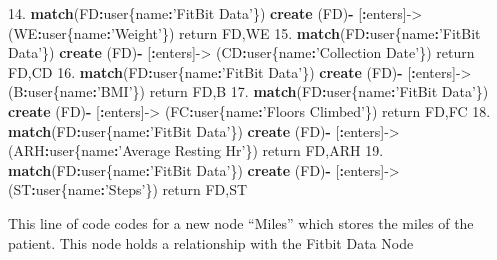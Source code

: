 \documentclass[]{book}
\newenvironment{Shaded}{\begin{snugshade}}{\end{snugshade}}
\newcommand{\KeywordTok}[1]{\textcolor[rgb]{0.13,0.29,0.53}{\textbf{#1}}}
\newcommand{\FloatTok}[1]{\textcolor[rgb]{0.00,0.00,0.81}{#1}}
\newcommand{\StringTok}[1]{\textcolor[rgb]{0.31,0.60,0.02}{#1}}
\newcommand{\OperatorTok}[1]{\textcolor[rgb]{0.81,0.36,0.00}{\textbf{#1}}}
\newcommand{\NormalTok}[1]{#1}
\begin{document}
\begin{Shaded}
\begin{Highlighting}[]
\FloatTok{14.} \KeywordTok{match}\NormalTok{(FD}\OperatorTok{:}\NormalTok{user\{name}\OperatorTok{:}\StringTok{'FitBit Data'}\NormalTok{\}) }\KeywordTok{create}\NormalTok{ (FD)}\OperatorTok{-}\StringTok{ }\NormalTok{[}\OperatorTok{:}\NormalTok{enters]->}\StringTok{ }\NormalTok{(WE}\OperatorTok{:}\NormalTok{user\{name}\OperatorTok{:}\StringTok{'Weight'}\NormalTok{\}) return FD,WE}
\FloatTok{15.} \KeywordTok{match}\NormalTok{(FD}\OperatorTok{:}\NormalTok{user\{name}\OperatorTok{:}\StringTok{'FitBit Data'}\NormalTok{\}) }\KeywordTok{create}\NormalTok{ (FD)}\OperatorTok{-}\StringTok{ }\NormalTok{[}\OperatorTok{:}\NormalTok{enters]->}\StringTok{ }\NormalTok{(CD}\OperatorTok{:}\NormalTok{user\{name}\OperatorTok{:}\StringTok{'Collection Date'}\NormalTok{\}) return FD,CD}
\FloatTok{16.} \KeywordTok{match}\NormalTok{(FD}\OperatorTok{:}\NormalTok{user\{name}\OperatorTok{:}\StringTok{'FitBit Data'}\NormalTok{\}) }\KeywordTok{create}\NormalTok{ (FD)}\OperatorTok{-}\StringTok{ }\NormalTok{[}\OperatorTok{:}\NormalTok{enters]->}\StringTok{ }\NormalTok{(B}\OperatorTok{:}\NormalTok{user\{name}\OperatorTok{:}\StringTok{'BMI'}\NormalTok{\}) return FD,B}
\FloatTok{17.} \KeywordTok{match}\NormalTok{(FD}\OperatorTok{:}\NormalTok{user\{name}\OperatorTok{:}\StringTok{'FitBit Data'}\NormalTok{\}) }\KeywordTok{create}\NormalTok{ (FD)}\OperatorTok{-}\StringTok{ }\NormalTok{[}\OperatorTok{:}\NormalTok{enters]->}\StringTok{ }\NormalTok{(FC}\OperatorTok{:}\NormalTok{user\{name}\OperatorTok{:}\StringTok{'Floors Climbed'}\NormalTok{\}) return FD,FC}
\FloatTok{18.} \KeywordTok{match}\NormalTok{(FD}\OperatorTok{:}\NormalTok{user\{name}\OperatorTok{:}\StringTok{'FitBit Data'}\NormalTok{\}) }\KeywordTok{create}\NormalTok{ (FD)}\OperatorTok{-}\StringTok{ }\NormalTok{[}\OperatorTok{:}\NormalTok{enters]->}\StringTok{ }\NormalTok{(ARH}\OperatorTok{:}\NormalTok{user\{name}\OperatorTok{:}\StringTok{'Average Resting Hr'}\NormalTok{\}) return FD,ARH}
\FloatTok{19.} \KeywordTok{match}\NormalTok{(FD}\OperatorTok{:}\NormalTok{user\{name}\OperatorTok{:}\StringTok{'FitBit Data'}\NormalTok{\}) }\KeywordTok{create}\NormalTok{ (FD)}\OperatorTok{-}\StringTok{ }\NormalTok{[}\OperatorTok{:}\NormalTok{enters]->}\StringTok{ }\NormalTok{(ST}\OperatorTok{:}\NormalTok{user\{name}\OperatorTok{:}\StringTok{'Steps'}\NormalTok{\}) return FD,ST}
\end{Highlighting}
\end{Shaded}

This line of code codes for a new node ``Miles'' which stores the miles
of the patient. This node holds a relationship with the Fitbit Data Node
\end{document}
